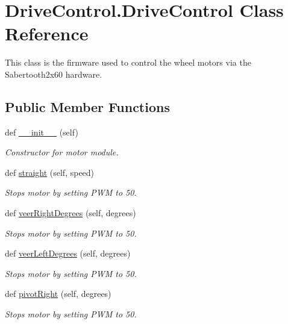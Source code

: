 \hypertarget{classDriveControl_1_1DriveControl}{}\section{Drive\+Control.\+Drive\+Control Class Reference}
\label{classDriveControl_1_1DriveControl}


This class is the firmware used to control the wheel motors via the Sabertooth2x60 hardware.  


\subsection*{Public Member Functions}
\begin{DoxyCompactItemize}
\item 
def \hyperlink{classDriveControl_1_1DriveControl_abcdb8160a3b27ddcf93d075dfa354eab}{\+\_\+\+\_\+init\+\_\+\+\_\+} (self)
\begin{DoxyCompactList}\small\item\em Constructor for motor module. \end{DoxyCompactList}\item 
def \hyperlink{classDriveControl_1_1DriveControl_a9afcb45e5ea4fb5492cc40e858e9a8c8}{straight} (self, speed)
\begin{DoxyCompactList}\small\item\em Stops motor by setting P\+WM to 50. \end{DoxyCompactList}\item 
def \hyperlink{classDriveControl_1_1DriveControl_afe4f7345885cfa6e96904274687ea564}{veer\+Right\+Degrees} (self, degrees)
\begin{DoxyCompactList}\small\item\em Stops motor by setting P\+WM to 50. \end{DoxyCompactList}\item 
def \hyperlink{classDriveControl_1_1DriveControl_af84ec21afdec4b56b3494d07d635b53c}{veer\+Left\+Degrees} (self, degrees)
\begin{DoxyCompactList}\small\item\em Stops motor by setting P\+WM to 50. \end{DoxyCompactList}\item 
def \hyperlink{classDriveControl_1_1DriveControl_af921359cc81d2299b2ddb5078ed1d749}{pivot\+Right} (self, degrees)
\begin{DoxyCompactList}\small\item\em Stops motor by setting P\+WM to 50. \end{DoxyCompactList}\item 

\end{DoxyCompactItemize}
